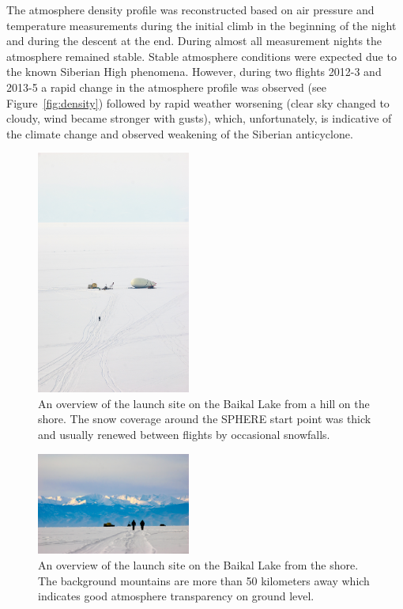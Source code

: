 \documentclass[universe,article,submit,moreauthors,pdftex]{Definitions/mdpi}
\begin{document}
The atmosphere density profile was reconstructed based on air pressure and temperature measurements during the initial climb in the beginning of the night and during the descent at the end. During almost all measurement nights the atmosphere remained stable. Stable atmosphere conditions were expected due to the known Siberian High phenomena. However, during two flights 2012-3 and 2013-5 a rapid change in the atmosphere profile was observed (see Figure~\ref{fig:density}) followed by rapid weather worsening (clear sky changed to cloudy, wind became stronger with gusts), which, unfortunately, is indicative of the climate change and observed weakening of the Siberian anticyclone. 

\begin{figure}[tb]
\begin{center}
    \includegraphics[trim=1cm 5cm 0cm 5cm,clip,width=0.45\textwidth]{DSC_4049.jpg}\hspace{2pc}%
    \caption{An overview of the launch site on the Baikal Lake from a hill on the shore. The snow coverage around the SPHERE start point was thick and usually renewed between flights by occasional snowfalls.}
\label{fig:baikal_snow}
\end{center}
\end{figure}


\begin{figure}[tb]
\begin{center}
    \includegraphics[width=0.45\textwidth]{DSC_7423.jpg}\hspace{2pc}%
    \caption{An overview of the launch site on the Baikal Lake from the shore. The background mountains are more than 50 kilometers away which indicates good atmosphere transparency on ground level.}
\label{fig:baikal_atmo}
\end{center}
\end{figure}
\end{document}
